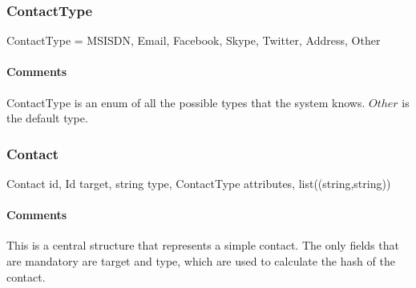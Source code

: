 \documentclass[a4paper,10pt]{article}
\begin{document}
\subsubsection{ContactType}
\begin{verbbox}
ContactType = { MSISDN, Email, Facebook, Skype, Twitter, Address,
                Other }
\end{verbbox}
\begin{center}
\theverbbox
\end{center}

\begin{inparaitem}[ ]
 \item \infrastructure
\end{inparaitem}

\paragraph*{Comments}
ContactType is an enum of all the possible types that the system knows. $Other$ is the default type.

\subsubsection{Contact}
\label{sec:structure:client:contact}

\begin{verbbox}
Contact
{
  id, Id
  target, string
  type, ContactType
  attributes, list((string,string))
}
\end{verbbox}
\begin{center}
\theverbbox
\end{center}

\begin{inparaitem}[ ]
 \item \infrastructure
\end{inparaitem}

\paragraph*{Comments}
This is a central structure that represents a simple contact. The only fields that are mandatory are target and type, which are used to calculate the hash of the contact.
\end{document}
